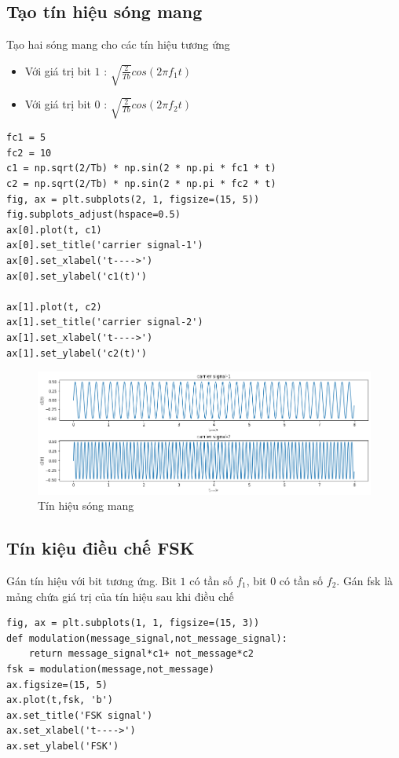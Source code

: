\subsection{Tạo tín hiệu sóng mang}
Tạo hai sóng mang cho các tín hiệu tương ứng
\begin{itemize}
\item Với giá trị bit $1$ : $\sqrt{\frac{2}{Tb}} cos(2 \pi f_1 t)$
\item Với giá trị bit $0$ : $\sqrt{\frac{2}{Tb}} cos(2 \pi f_2 t)$
\end{itemize}
\begin{lstlisting}
fc1 = 5
fc2 = 10
c1 = np.sqrt(2/Tb) * np.sin(2 * np.pi * fc1 * t)
c2 = np.sqrt(2/Tb) * np.sin(2 * np.pi * fc2 * t)
fig, ax = plt.subplots(2, 1, figsize=(15, 5))
fig.subplots_adjust(hspace=0.5)
ax[0].plot(t, c1)
ax[0].set_title('carrier signal-1')
ax[0].set_xlabel('t---->')
ax[0].set_ylabel('c1(t)')

ax[1].plot(t, c2)
ax[1].set_title('carrier signal-2')
ax[1].set_xlabel('t---->')
ax[1].set_ylabel('c2(t)')
\end{lstlisting}

\begin{center}
    \begin{figure}[htp]
    \begin{center}
     \includegraphics[scale=.5]{Img/carrier_signal.png}
    \end{center}
    \caption{Tín hiệu sóng mang}
    \label{refhinh1}
    \end{figure}
\end{center}

\subsection{Tín kiệu điều chế FSK}
Gán tín hiệu với bit tương ứng. Bit $1$ có tần số $f_1$, bit $0$ có tần số $f_2$.
Gán fsk là mảng chứa giá trị của tín hiệu sau khi điều chế
\begin{lstlisting}
fig, ax = plt.subplots(1, 1, figsize=(15, 3))
def modulation(message_signal,not_message_signal):  
    return message_signal*c1+ not_message*c2
fsk = modulation(message,not_message)
ax.figsize=(15, 5)
ax.plot(t,fsk, 'b')
ax.set_title('FSK signal')
ax.set_xlabel('t---->')
ax.set_ylabel('FSK')
\end{lstlisting}



